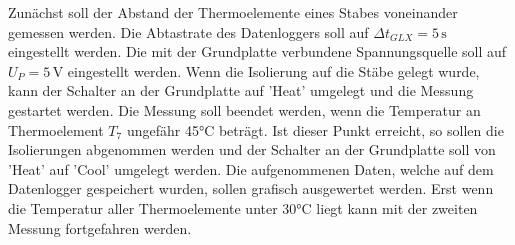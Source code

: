 Zunächst soll der Abstand der Thermoelemente eines Stabes voneinander gemessen werden.
Die Abtastrate des Datenloggers soll auf $\Delta t_{GLX} = 5\, \si{\second}$ eingestellt werden.
Die mit der Grundplatte verbundene Spannungsquelle soll auf $U_P = 5\, \si{\volt}$ eingestellt 
werden. Wenn die Isolierung auf die Stäbe gelegt wurde, kann der Schalter an der Grundplatte auf
'Heat' umgelegt und die Messung gestartet werden. Die Messung soll beendet werden, wenn die 
Temperatur an Thermoelement $T_7$ ungefähr 45°C beträgt. Ist dieser Punkt erreicht, so sollen 
die Isolierungen abgenommen werden und der Schalter an der Grundplatte soll von 'Heat' auf
'Cool' umgelegt werden. Die aufgenommenen Daten, welche auf dem Datenlogger gespeichert wurden,
sollen grafisch ausgewertet werden. Erst wenn die Temperatur aller Thermoelemente unter 30°C 
liegt kann mit der zweiten Messung fortgefahren werden.



